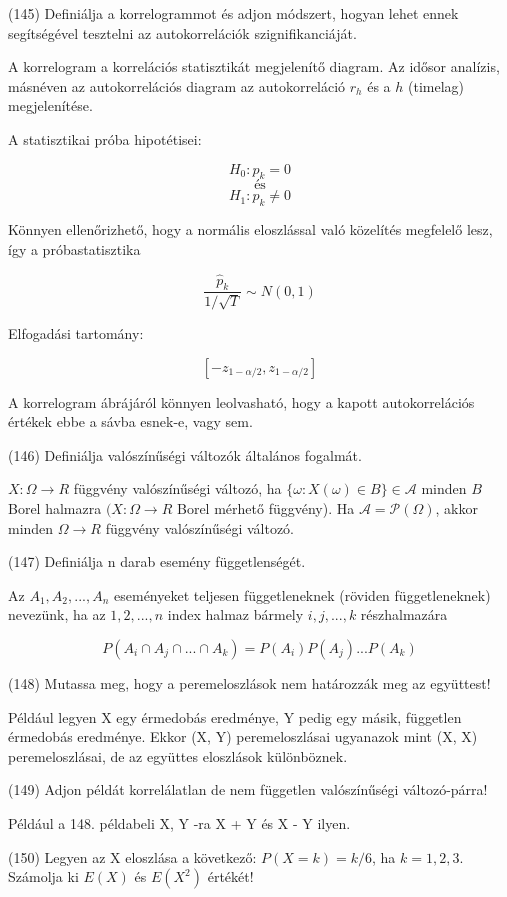 \documentclass[12p]{article}
\begin{document}
(145) Definiálja a korrelogrammot és adjon módszert, hogyan lehet ennek segítségével tesztelni
az autokorrelációk szignifikanciáját.

A korrelogram a korrelációs statisztikát megjelenítő diagram. Az idősor analízis, másnéven az autokorrelációs diagram az autokorreláció $r_h$ és a $h$ (timelag) megjelenítése.

A statisztikai próba hipotétisei:

$$H_0 : p_k = 0$$
\[
	\text{és}
\]
$$H_1 : p_k \neq 0$$

Könnyen ellenőrizhető, hogy a normális eloszlással való közelítés megfelelő
lesz, így a próbastatisztika

$$\frac{\hat{p}_k}{1/\sqrt{T}} \sim N(0,1) $$

Elfogadási tartomány:

$$[-z_{1-\alpha/2},z_{1-\alpha/2}]$$

A korrelogram ábrájáról könnyen leolvasható, hogy a kapott autokorrelációs
értékek ebbe a sávba esnek-e, vagy sem.

(146) Definiálja valószínűségi változók általános fogalmát.

$X : \Omega \rightarrow R$ függvény valószínűségi változó, ha $\{\omega: X(\omega) \in B\} \in \mathscr{A}$ minden $B$ Borel halmazra $(X: \Omega \rightarrow R$ Borel mérhető függvény).
Ha $\mathscr{A} = \mathscr{P}(\Omega)$, akkor minden $\Omega \rightarrow R$ függvény valószínűségi változó.


(147) Definiálja n darab esemény függetlenségét.

Az $A_1,A_2, ..., A_n$ eseményeket teljesen függetleneknek (röviden függetleneknek) nevezünk, ha az ${1, 2, ..., n}$ index halmaz bármely ${i, j, ..., k}$ részhalmazára

$$P(A_i \cap A_j \cap ... \cap A_k) = P(A_i)P(A_j)...P(A_k)$$

(148) Mutassa meg, hogy a peremeloszlások nem határozzák meg az együttest!

Például legyen X egy érmedobás eredménye, Y pedig egy másik, független érmedobás eredménye. Ekkor (X, Y) peremeloszlásai ugyanazok mint (X, X) peremeloszlásai, de az együttes eloszlások különböznek.

(149) Adjon példát korrelálatlan de nem független valószínűségi változó-párra!

Például a 148. példabeli X, Y -ra X + Y és X - Y ilyen.

(150) Legyen az X eloszlása a következő: $P(X = k) = k/6$, ha $k = 1, 2, 3$. Számolja ki $E(X)$ és $E(X^2)$ értékét!
\end{document}

